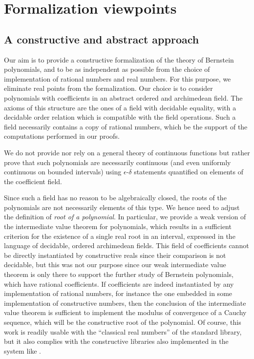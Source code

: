 \documentclass{mscs}
\begin{document}
\section{Formalization viewpoints}
\label{sec:rational}

\subsection{A constructive and abstract approach}
Our aim is to provide a constructive formalization of the theory of
Bernstein polynomials, and to be as independent as possible from the
choice of implementation of rational numbers and real numbers. For this
purpose, we eliminate real points from the formalization. Our choice
is to consider polynomials with coefficients in an abstract ordered and
archimedean field. The axioms of this structure are the ones of a
field with decidable equality, with a decidable order relation which is
compatible with the field operations. Such a field necessarily
contains a copy of rational numbers, which be the support of the
computations performed in our proofs.

We do not provide
nor rely on a general theory of continuous functions but rather prove
that such polynomials are necessarily continuous (and even uniformly
continuous on bounded intervals) using $\epsilon$-$\delta$ statements
quantified on elements of the coefficient field.

Since such a field has no reason
to be algebraically closed, the roots of the polynomials are not
necessarily elements of this type. We hence need to adjust the
definition of {\em root of a polynomial}. In particular, we provide a
weak version of the intermediate value theorem for polynomials, which
results in a sufficient criterion for the existence of a single real root in
an interval, expressed in the language of decidable, ordered
archimedean fields. This field of coefficients cannot be directly
instantiated by constructive reals since their comparison is not
decidable, but this was not our purpose since our weak intermediate
value theorem is only there to support the further study of Bernstein
polynomials, which have rational coefficients. If coefficients are
indeed instantiated by any implementation of
rational numbers, for instance the one embedded in some implementation
of constructive numbers, then the conclusion of the intermediate
value theorem is sufficient to implement the modulus of convergence of
a Cauchy sequence, which will be the constructive root of the
polynomial. Of course, this work is readily usable  with the
``classical real numbers'' of the standard \Coq{} library, but it also
complies with the constructive libraries also implemented in the \Coq{}
system like \cite{DBLP:conf/mkm/Cruz-FilipeGW04, russellreals,
  russellcoqreals}.
\end{document}

